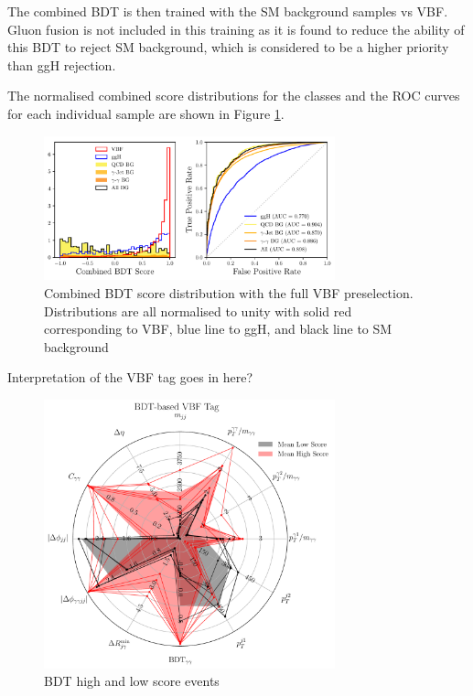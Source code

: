The combined BDT is then trained with the SM background samples vs VBF. Gluon fusion is not included in this training as it is found to reduce the ability of this BDT to reject SM background, which is considered to be a higher priority than ggH rejection. 

The normalised combined score distributions for the classes and the ROC curves for each individual sample are shown in Figure \ref{fig:event_categorisaton:combined_bdt_performance}.
\begin{figure}[h!]
    \begin{center}
        \includegraphics[width=0.75\textwidth]{figures/event_selection/combined_BDT_PS.pdf}
    \end{center}
    \caption{Combined BDT score distribution with the full VBF preselection. Distributions are all normalised to unity with solid red corresponding to VBF, blue line to ggH, and black line to SM background}
    \label{fig:event_categorisaton:combined_bdt_performance}
\end{figure}


Interpretation of the VBF tag goes in here?
\begin{figure}[h!]
    \includegraphics[width=0.75\textwidth]{figures/event_selection/eng_feature_radar_BDT.pdf}
    \caption{BDT high and low score events}
    \label{fig:event_categorisaton:bdt_based_vbf_tag_interpretation}
\end{figure}








